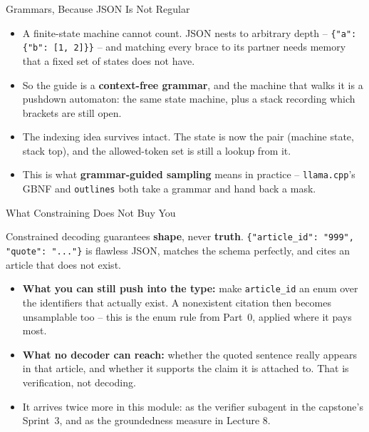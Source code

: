 \begin{frame}{Grammars, Because JSON Is Not Regular}
\begin{itemize}
  \item A finite-state machine cannot count. JSON nests to arbitrary depth -- \texttt{\{"a": \{"b": [1, 2]\}\}} -- and matching every brace to its partner needs memory that a fixed set of states does not have.
  \pause
  \item So the guide is a \textbf{context-free grammar}, and the machine that walks it is a pushdown automaton: the same state machine, plus a stack recording which brackets are still open.
  \pause
  \item The indexing idea survives intact. The state is now the pair (machine state, stack top), and the allowed-token set is still a lookup from it.
  \pause
  \item This is what \textbf{grammar-guided sampling} means in practice -- \texttt{llama.cpp}'s GBNF and \texttt{outlines} both take a grammar and hand back a mask.
\end{itemize}
\end{frame}

\begin{frame}{What Constraining Does Not Buy You}
\begin{rlpitfall}
Constrained decoding guarantees \textbf{shape}, never \textbf{truth}. \texttt{\{"article\_id": "999", "quote": "..."\}} is flawless JSON, matches the schema perfectly, and cites an article that does not exist.
\end{rlpitfall}
\pause
\begin{itemize}
  \item \textbf{What you can still push into the type:} make \texttt{article\_id} an enum over the identifiers that actually exist. A nonexistent citation then becomes unsamplable too -- this is the enum rule from Part~0, applied where it pays most.
  \pause
  \item \textbf{What no decoder can reach:} whether the quoted sentence really appears in that article, and whether it supports the claim it is attached to. That is verification, not decoding.
  \pause
  \item It arrives twice more in this module: as the verifier subagent in the capstone's Sprint~3, and as the groundedness measure in Lecture 8.
\end{itemize}
\end{frame}

